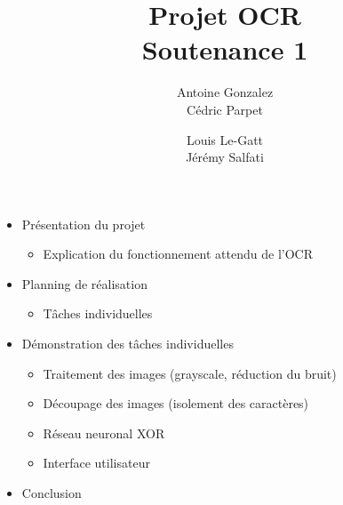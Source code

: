 \documentclass[14pt]{extarticle}
\title{
	{\Huge Projet OCR}\\
	\vspace{2em}
	{Soutenance 1}\\
}
\author{
	Antoine Gonzalez\\
	Cédric Parpet
	\and
	Louis Le-Gatt\\
	Jérémy Salfati}
\begin{document}
\maketitle
\vspace{1em}

\begin{itemize}
    \item Présentation du projet
    \begin{itemize}
        \item Explication du fonctionnement attendu de l'OCR
    \end{itemize}

    \item Planning de réalisation
    \begin{itemize}
        \item Tâches individuelles
    \end{itemize}

    \item Démonstration des tâches individuelles
    \begin{itemize}
        \item Traitement des images (grayscale, réduction du bruit)
        \item Découpage des images (isolement des caractères)
        \item Réseau neuronal XOR
        \item Interface utilisateur
    \end{itemize}

    \item Conclusion
\end{itemize}
\end{document}
